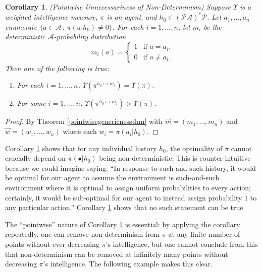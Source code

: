\documentclass{article}
\newtheorem{corollary}[theorem]{Corollary}
\begin{document}
\begin{corollary}
\label{nondeterminismcorollary}
    (Pointwise Unnecessariness of Non-Determinism)
    Suppose $\Upsilon$ is a weighted intelligence measure, $\pi$ is an agent,
    and $h_0\in(\mathcal P\mathcal A)^*\mathcal P$.
    Let $a_1,\ldots,a_n$ enumerate $\{a\in\mathcal A\,:\,\pi(a|h_0)\not=0\}$.
    For each $i=1,\ldots,n$, let $m_i$ be the
    deterministic $\mathcal A$-probability distribution
    \[
        m_i(a) = \begin{cases}
            1 &\mbox{if $a=a_i$,}\\
            0 &\mbox{if $a\not=a_i$.}
        \end{cases}
    \]
    Then one of the following is true:
    \begin{enumerate}
        \item
        For each $i=1,\ldots,n$, $\Upsilon(\pi^{h_0\mapsto m_i})=\Upsilon(\pi)$.
        \item
        For some $i=1,\ldots,n$, $\Upsilon(\pi^{h_0\mapsto m_i})>\Upsilon(\pi)$.
    \end{enumerate}
\end{corollary}

\begin{proof}
    By Theorem \ref{pointwisegenericnessthm} with
    $\vec m=(m_1,\ldots,m_n)$ and $\vec w=(w_1,\ldots,w_n)$ where each
    $w_i=\pi(a_i|h_0)$.
\end{proof}

Corollary \ref{nondeterminismcorollary} shows that for any individual
history $h_0$, the optimality of $\pi$ cannot crucially depend on $\pi(\bullet|h_0)$
being non-deterministic. This is counter-intuitive because we could imagine saying:
``In response to such-and-such history, it would be optimal for our agent
to assume the environment is such-and-such environment where it is optimal to
assign uniform probabilities to every action;
certainly, it would be sub-optimal for our agent to instead assign probability $1$ to
any particular action.'' Corollary \ref{nondeterminismcorollary} shows
that no such statement can be true.

The ``pointwise'' nature of Corollary \ref{nondeterminismcorollary}
is essential: by applying the corollary repeatedly, one can remove non-determinism
from $\pi$ at any finite number of points without ever decreasing $\pi$'s intelligence,
but one cannot conclude from this that non-determinism can be removed at infinitely
many points without decreasing $\pi$'s intelligence. The following example makes this
clear.
\end{document}
